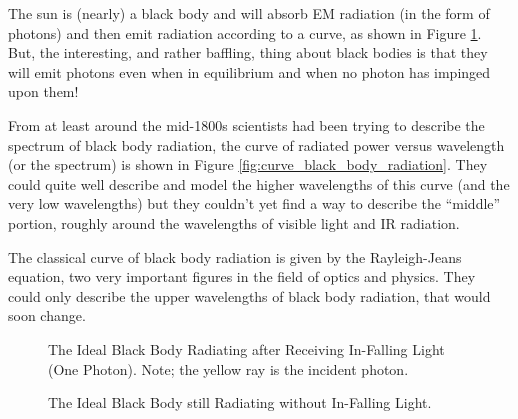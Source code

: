 \documentclass[../../Quantum-Technologies-Notes]{subfiles}
\begin{document}
			\begin{paracol}{2}
				
				The sun is (nearly) a black body and will absorb EM radiation (in the form of photons) and then emit radiation according to a curve, as shown in Figure \ref{fig:ideal_black_body_radiating_w_light}. But, the interesting, and rather baffling, thing about black bodies is that they will emit photons even when in equilibrium and when no photon has impinged upon them! \linebreak
				
				From at least around the mid-1800s scientists had been trying to describe the spectrum of black body radiation, the curve of radiated power versus wavelength (or the spectrum) is shown in Figure \ref{fig:curve_black_body_radiation}. They could quite well describe and model the higher wavelengths of this curve (and the very low wavelengths) but they couldn't yet find a way to describe the ``middle'' portion, roughly around the wavelengths of visible light and IR radiation. \linebreak
				
				The classical curve of black body radiation is given by the Rayleigh-Jeans equation, two very important figures in the field of optics and physics. They could only describe the upper wavelengths of black body radiation, that would soon change. \linebreak
				
				\switchcolumn
				
				
				\begin{figure}[!ht]
					\centering
					
					\caption{The Ideal Black Body Radiating after Receiving In-Falling Light (One Photon). \footnotesize Note; the yellow ray is the incident photon.}
					\label{fig:ideal_black_body_radiating_w_light}
				\end{figure}
				
				
				\begin{figure}[!ht]
					\centering
					
					\caption{The Ideal Black Body still Radiating without In-Falling Light.}
					\label{fig:ideal_black_body_radiating_wout_light}
				\end{figure}
				
			\end{paracol}
			
\end{document}
